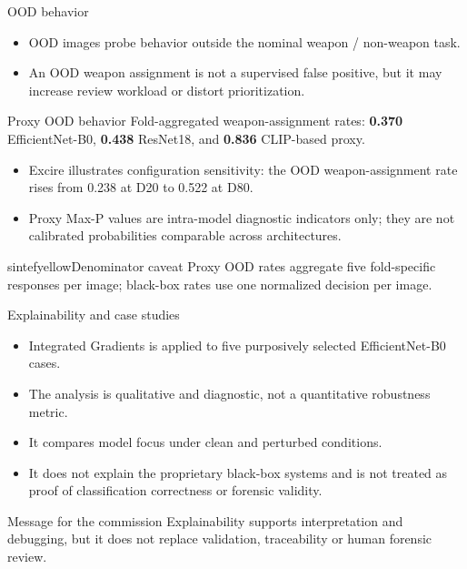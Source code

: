 \documentclass{beamer}
\begin{document}
\begin{frame}[shrink=2]{OOD behavior}

\begin{itemize}
    \item OOD images probe behavior outside the nominal weapon / non-weapon task.
    \item An OOD weapon assignment is not a supervised false positive, but it may increase review workload or distort prioritization.
\end{itemize}

\begin{block}{Proxy OOD behavior}
Fold-aggregated weapon-assignment rates:
\textbf{0.370} EfficientNet-B0,
\textbf{0.438} ResNet18,
and \textbf{0.836} CLIP-based proxy.
\end{block}

\begin{itemize}
    \item Excire illustrates configuration sensitivity: the OOD weapon-assignment rate rises from 0.238 at D20 to 0.522 at D80.
    \item Proxy Max-P values are intra-model diagnostic indicators only; they are not calibrated probabilities comparable across architectures.
\end{itemize}

\begin{colorblock}[black]{sintefyellow}{Denominator caveat}
Proxy OOD rates aggregate five fold-specific responses per image; black-box rates use one normalized decision per image.
\end{colorblock}

\end{frame}


\begin{frame}{Explainability and case studies}

\begin{itemize}
    \item Integrated Gradients is applied to five purposively selected EfficientNet-B0 cases.
    \item The analysis is qualitative and diagnostic, not a quantitative robustness metric.
    \item It compares model focus under clean and perturbed conditions.
    \item It does not explain the proprietary black-box systems and is not treated as proof of classification correctness or forensic validity.
\end{itemize}

\begin{block}{Message for the commission}
Explainability supports interpretation and debugging, but it does not replace validation, traceability or human forensic review.
\end{block}

\end{frame}
\end{document}
